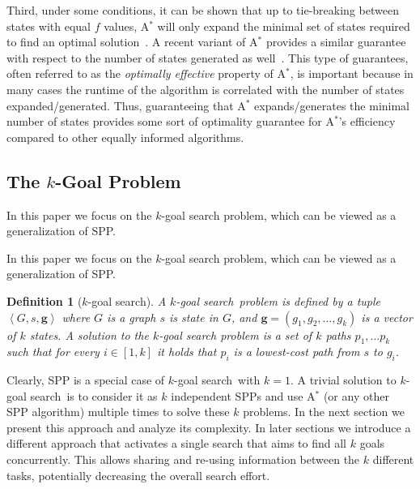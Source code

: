 \documentclass{aicom2e}
\newtheorem{definition}{Definition}
\newcommand{\kgs}{$k$-goal search}
\newcommand{\astar}{A$^*$}
\newcommand{\tuple}[1]{\ensuremath{\left \langle #1 \right \rangle }}
\begin{document}
Third, under some conditions, it can be shown that up to tie-breaking between states with equal $f$ values, \astar{} will only expand the minimal set of states required to find an optimal solution~\cite{dechter1985generalizedBestFirst}. 
A recent variant of \astar{} provides a similar guarantee with respect to the number of states generated as well~\cite{goldenberg2014enhanced}. This type of guarantees, often referred to as the {\em optimally effective} property of \astar{}, is  important because in many cases the runtime of the algorithm is correlated with the number of states expanded/generated. 
Thus, guaranteeing that \astar{} expands/generates the minimal number of states provides some sort of optimality guarantee for \astar{}'s efficiency compared to other equally informed algorithms. 



\subsection{The $k$-Goal Problem}
In this paper we focus on the $k$-goal search problem, which can be viewed as a generalization of SPP. 

In this paper we focus on the $k$-goal search problem, which can be viewed as a
generalization of SPP.



\begin{definition}[$k$-goal search]
	A \kgs\ problem is defined by a tuple $\tuple{G,s, \textbf{g}}$
		where $G$ is a graph
		$s$ is state in $G$, 
		and $\textbf{g}=(g_1,g_2,\ldots,g_k)$ is a vector of $k$ states. 
	A solution to the \kgs{} problem is a set of $k$ paths $p_1,\ldots p_k$ such that for every 
	$i\in [1,k]$ it holds that $p_i$ is a lowest-cost path from $s$ to $g_i$. 
\label{def:k-goal}
\end{definition}


Clearly, SPP is a special case of \kgs\ with $k=1$. A trivial solution to \kgs\ is to consider it as $k$ independent SPPs and use \astar{} (or any other SPP algorithm) multiple times to solve these $k$ problems. 
In the next section we present this approach and analyze its complexity. In later sections we introduce a different approach that activates a single search that aims to find all $k$ goals concurrently. This allows sharing and re-using information between the $k$ different tasks, potentially decreasing the overall search effort. 
\end{document}
